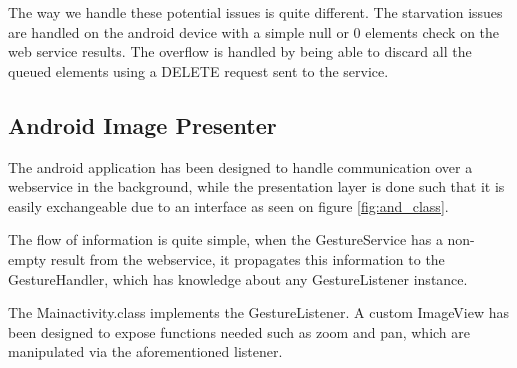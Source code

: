 The way we handle these potential issues is quite different.
The starvation issues are handled on the android device with a simple null or 0 elements check on the web service results.
The overflow is handled by being able to discard all the queued elements using a DELETE request sent to the service.

\subsection{Android Image Presenter}
The android application has been designed to handle communication over a webservice in the background, 
while the presentation layer is done such that it is easily exchangeable due to an interface as seen on figure \ref{fig:and_class}.

The flow of information is quite simple, when the GestureService has a non-empty result from the webservice,
it propagates this information to the GestureHandler, which has knowledge about any GestureListener instance.

The Mainactivity.class implements the GestureListener.
A custom ImageView has been designed to expose functions needed such as zoom and pan, which are manipulated via the aforementioned listener.
